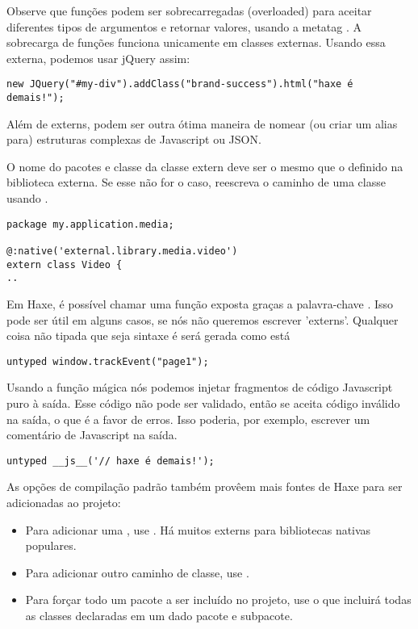 Observe que funções podem ser sobrecarregadas (overloaded) para aceitar diferentes tipos de argumentos e retornar valores, usando a metatag . A sobrecarga de funções funciona unicamente em classes externas.
Usando essa externa, podemos usar jQuery assim:

\begin{lstlisting}
new JQuery("#my-div").addClass("brand-success").html("haxe é demais!");
\end{lstlisting}

Além de externs,  podem ser outra ótima maneira de nomear (ou criar um alias para) estruturas complexas de Javascript ou JSON.

O nome do pacotes e classe da classe extern deve ser o mesmo que o definido na biblioteca externa. Se esse não for o caso, reescreva o caminho de uma classe usando .

\begin{lstlisting}
package my.application.media;

@:native('external.library.media.video')
extern class Video {
..
\end{lstlisting}

Em Haxe, é possível chamar uma função exposta graças a palavra-chave . Isso
pode ser útil em alguns casos, se nós não queremos escrever 'externs'. Qualquer coisa não tipada que seja sintaxe é será gerada como está

\begin{lstlisting}
untyped window.trackEvent("page1");  
\end{lstlisting}

Usando a função mágica  nós podemos injetar fragmentos de código Javascript puro à saída. Esse código não pode ser validado, então se aceita código inválido na saída, o que é a favor de erros.
Isso poderia, por exemplo, escrever um comentário de Javascript na saída.

\begin{lstlisting}
untyped __js__('// haxe é demais!');
\end{lstlisting}

As opções de compilação padrão também provêem mais fontes de Haxe para ser adicionadas ao projeto:

\begin{itemize}
	\item Para adicionar uma  , use . Há muitos externs para bibliotecas nativas  populares.
	\item Para adicionar outro caminho de classe, use .
	\item Para forçar todo um pacote a ser incluído no projeto, use  o que incluirá todas as classes declaradas em um dado pacote e subpacote.
\end{itemize}

